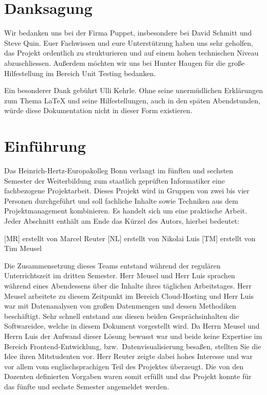 \chapter*{Danksagung}
Wir bedanken uns bei der Firma Puppet, insbesondere bei David Schmitt und Steve
Quin. Euer Fachwissen und eure Unterstützung haben uns sehr geholfen, das
Projekt ordentlich zu strukturieren und auf einem hohen technischen Niveau
abzuschliessen. Außerdem möchten wir uns bei Hunter Haugen für die
große Hilfestellung im Bereich Unit Testing bedanken.

Ein besonderer Dank gebührt Ulli Kehrle. Ohne seine unermüdlichen Erklärungen
zum Thema \LaTeX{} und seine Hilfestellungen, auch in den späten Abendstunden,
würde diese Dokumentation nicht in dieser Form existieren.

\newpage

\tableofcontents
\listoffigures
\begingroup
\let\clearpage\relax
\lstlistoflistings{}
\listoftables
\endgroup

\chapter{Einführung}
\label{chap:einfuehrung}
Das Heinrich\hyp{}Hertz\hyp{}Europakolleg Bonn verlangt im fünften und sechsten
Semester der Weiterbildung zum staatlich geprüften Informatiker eine
fachbezogene Projektarbeit. Dieses Projekt wird in Gruppen von zwei bis vier
Personen durchgeführt und soll fachliche Inhalte sowie Techniken aus dem
Projektmanagement kombinieren. Es handelt sich um eine praktische Arbeit. Jeder
Abschnitt enthält am Ende das Kürzel des Autors, hierbei bedeutet:

\begin{outline}
  \1 {[MR]} erstellt von Marcel Reuter
  \1 {[NL]} erstellt von Nikolai Luis
  \1 {[TM]} erstellt von Tim Meusel
\end{outline}

Die Zusammensetzung dieses Teams entstand während der regulären Unterrichtszeit
im dritten Semester. Herr Meusel und Herr Luis sprachen während eines
Abendessens über die Inhalte ihres täglichen Arbeitstages. Herr Meusel
arbeitete zu diesem Zeitpunkt im Bereich Cloud\hyp{}Hosting und Herr Luis war
mit Datenanalysen von großen Datenmengen und dessen Methodiken beschäftigt.
Sehr schnell entstand aus diesen beiden Gesprächsinhalten die Softwareidee,
welche in diesem Dokument vorgestellt wird. Da Herrn Meusel und Herrn Luis der
Aufwand dieser Lösung bewusst war und beide keine Expertise im Bereich
Frontend\hyp{}Entwicklung, bzw.\ Datenvisualisierung besaßen, stellten Sie die
Idee ihren Mitstudenten vor. Herr Reuter zeigte dabei hohes Interesse und war
vor allem vom englischsprachigen Teil des Projektes überzeugt. Die von den
Dozenten definierten Vorgaben waren somit erfüllt und das Projekt konnte für
das fünfte und sechste Semester angemeldet werden.

